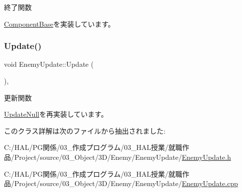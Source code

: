 終了関数 



\mbox{\hyperlink{class_component_base_a9f42beaf0383d6f629819579cab4de57}{Component\+Base}}を実装しています。

\mbox{\label{class_enemy_update_ae9662f3a2d064dc69c0d68293e60f051}} 
\subsubsection{\texorpdfstring{Update()}{Update()}}
{\footnotesize\ttfamily void Enemy\+Update\+::\+Update (\begin{DoxyParamCaption}{ }\end{DoxyParamCaption})\hspace{0.3cm}{\ttfamily [override]}, {\ttfamily [virtual]}}



更新関数 



\mbox{\hyperlink{class_update_null_a692f4f34e4ef35ca286a1d3606fdf473}{Update\+Null}}を再実装しています。



このクラス詳解は次のファイルから抽出されました\+:\begin{DoxyCompactItemize}
\item 
C\+:/\+H\+A\+L/\+P\+G関係/03\+\_\+作成プログラム/03\+\_\+\+H\+A\+L授業/就職作品/\+Project/source/03\+\_\+\+Object/3\+D/\+Enemy/\+Enemy\+Update/\mbox{\hyperlink{_enemy_update_8h}{Enemy\+Update.\+h}}\item 
C\+:/\+H\+A\+L/\+P\+G関係/03\+\_\+作成プログラム/03\+\_\+\+H\+A\+L授業/就職作品/\+Project/source/03\+\_\+\+Object/3\+D/\+Enemy/\+Enemy\+Update/\mbox{\hyperlink{_enemy_update_8cpp}{Enemy\+Update.\+cpp}}\end{DoxyCompactItemize}

